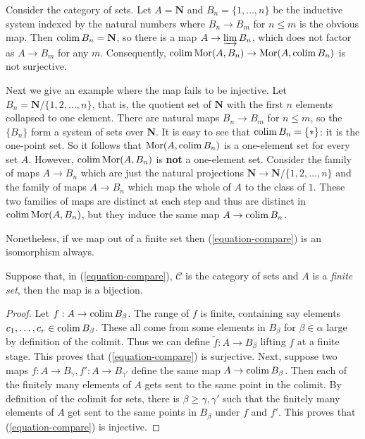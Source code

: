 \begin{example}
\label{example-not-surjective}
Consider the category of sets. Let $A = \mathbf{N}$ and
$B_n = \{1, \dots, n\}$ be the inductive system indexed by the natural numbers
where $B_n \to B_m$ for $n \leq m$ is the obvious map. Then
$\mathop{\rm colim}\nolimits B_n = \mathbf{N}$, so there is a map
$A \to \varinjlim B_n$, which does not factor as $A \to B_m$
for any $m$. Consequently,
$\mathop{\rm colim}\nolimits \mathop{\rm Mor}\nolimits(A, B_n) \to \mathop{\rm Mor}\nolimits(A, \mathop{\rm colim}\nolimits B_n)$
is not surjective.
\end{example}

\begin{example}
\label{example-not-injective}
Next we give an example where the map fails to be injective. Let $B_n =
\mathbf{N}/\{1,  2, \dots, n\}$, that is, the quotient set of
$\mathbf{N}$ with the first $n$ elements collapsed to one element.
There are natural maps $B_n \to B_m$ for $n \leq m$, so the
$\{B_n\}$ form a system of sets over $\mathbf{N}$. It is easy to see that
$\mathop{\rm colim}\nolimits B_n = \{*\}$: it is the one-point set.
So it follows that $\mathop{\rm Mor}\nolimits(A, \mathop{\rm colim}\nolimits B_n)$ is a one-element set
for every set $A$.
However, $\mathop{\rm colim}\nolimits \mathop{\rm Mor}\nolimits(A , B_n)$ is {\bf not} a one-element set.
Consider the family of maps $A \to B_n$ which are just the natural projections
$\mathbf{N} \to \mathbf{N}/\{1, 2, \dots, n\}$ and the family of
maps $A \to B_n$ which map the whole of $A$ to the class of $1$.
These two families of maps are distinct at each step and thus are distinct in
$\mathop{\rm colim}\nolimits \mathop{\rm Mor}\nolimits(A, B_n)$, but they induce the same map
$A \to \mathop{\rm colim}\nolimits B_n$.
\end{example}

\noindent
Nonetheless, if we map out of a finite set then
(\ref{equation-compare}) is an isomorphism always.

\begin{lemma}
\label{lemma-out-of-finite}
Suppose that, in (\ref{equation-compare}), $\mathcal{C}$ is the category
of sets and $A$ is a {\it finite set}, then the map is a bijection.
\end{lemma}

\begin{proof}
Let $f : A \to \mathop{\rm colim}\nolimits B_\beta$.
The range of $f$ is finite, containing say
elements $c_1, \dots, c_r \in \mathop{\rm colim}\nolimits B_\beta$.
These all come from some elements in $B_\beta$ for $\beta \in \alpha$
large by definition of the colimit. Thus we can define
$\widetilde{f} : A \to B_\beta$ lifting $f$ at a finite stage.
This proves that (\ref{equation-compare}) is surjective.
Next, suppose two maps $f : A \to B_\gamma, f' : A \to B_{\gamma'}$
define the same map $A \to \mathop{\rm colim}\nolimits B_\beta$.
Then each of the finitely many elements of $A$ gets sent to the same point in
the colimit. By definition of the colimit for sets, there is
$\beta \geq \gamma, \gamma'$ such that the finitely many elements of
$A$ get sent to the same points in $B_\beta$ under $f$ and $f'$.
This proves that (\ref{equation-compare}) is injective.
\end{proof}


